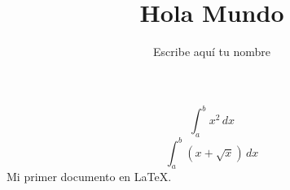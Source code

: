 \documentclass{article}
\title{Hola Mundo}
\author{Escribe aqu\'i tu nombre}
\begin{document}

\maketitle
\[\int_{a}^{b} x^2 \,dx\]
\[\int_{a}^{b} (x+ \sqrt{x}) \,dx\]
Mi primer documento en \LaTeX{}.
\end{document}

